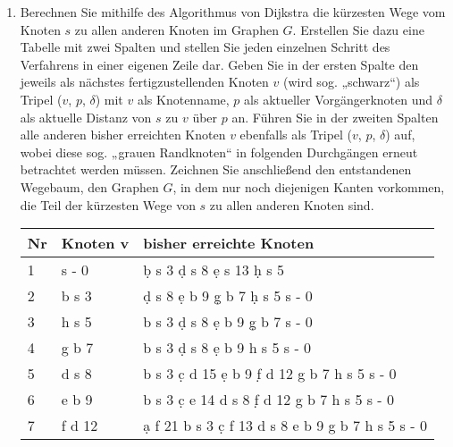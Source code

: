 \documentclass{lehramt-informatik-aufgabe}
\begin{document}
\begin{enumerate}


\item Berechnen Sie mithilfe des Algorithmus von Dijkstra die kürzesten
Wege vom Knoten $s$ zu allen anderen Knoten im Graphen $G$. Erstellen
Sie dazu eine Tabelle mit zwei Spalten und stellen Sie jeden einzelnen
Schritt des Verfahrens in einer eigenen Zeile dar. Geben Sie in der
ersten Spalte den jeweils als nächstes fertigzustellenden Knoten $v$
(wird sog. „schwarz“) als Tripel ($v$, $p$, $\delta$) mit $v$ als
Knotenname, $p$ als aktueller Vorgängerknoten und $\delta$ als aktuelle
Distanz von $s$ zu $v$ über $p$ an. Führen Sie in der zweiten Spalten
alle anderen bisher erreichten Knoten $v$ ebenfalls als Tripel ($v$,
$p$, $\delta$) auf, wobei diese sog. „grauen Randknoten“ in folgenden
Durchgängen erneut betrachtet werden müssen. Zeichnen Sie anschließend
den entstandenen Wegebaum, \dh den Graphen $G$, in dem nur noch
diejenigen Kanten vorkommen, die Teil der kürzesten Wege von $s$ zu
allen anderen Knoten sind.

\begin{liAntwort}
\begin{tabular}{l|l|l}
Nr & Knoten v & bisher erreichte Knoten \\\hline
1 & \D s - 0 &
\scriptsize
\d b s 3
\d d s 8
\d e s {13}
\d h s 5
\\

2 & \D b s 3 &
\scriptsize
\d d s 8
\d e b 9
\d g b 7
\d h s 5
\D s - 0
\\

3 & \D h s 5 &
\scriptsize
\D b s 3
\d d s 8
\d e b 9
\d g b 7
%
\D s - 0
\\

4 & \D g b 7 &
\scriptsize
\D b s 3
\d d s 8
\d e b 9
\D h s 5
\D s - 0
\\

5 & \D d s 8 &
\scriptsize
\D b s 3
\d c d {15}
\d e b 9
\d f d {12}
\D g b 7
\D h s 5
\D s - 0
\\

6 & \D e b 9 &
\scriptsize
\D b s 3
\d c e {14}
\D d s 8
\d f d {12}
\D g b 7
\D h s 5
\D s - 0
\\

7 & \D f d {12} &
\scriptsize
\d a f {21}
\D b s 3
\d c f {13}
\D d s 8
\D e b 9
\D g b 7
\D h s 5
\D s - 0
\\


\end{tabular}
\end{liAntwort}
\end{enumerate}
\end{document}
